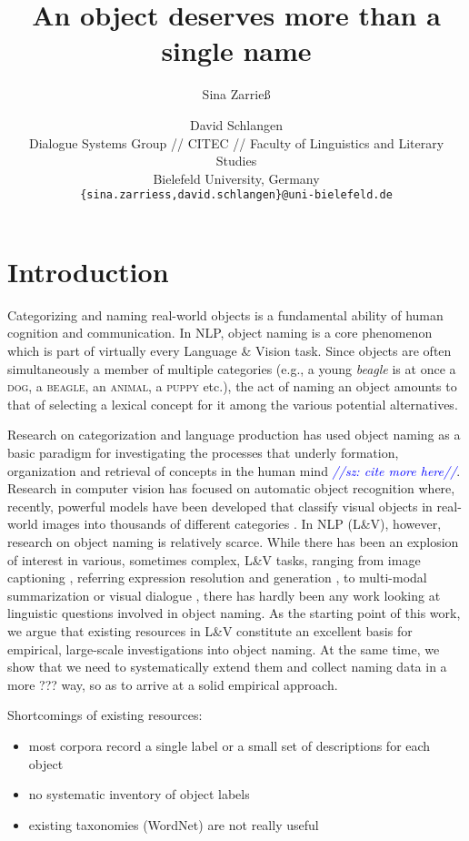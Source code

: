 \documentclass[11pt]{article}
\title{An object deserves more than a single name}
\author{Sina Zarrie{\ss}  \and David Schlangen\\
  Dialogue Systems Group // CITEC // Faculty of Linguistics and Literary Studies \\
 Bielefeld University, Germany \\
  {\tt \{sina.zarriess,david.schlangen\}@uni-bielefeld.de} \\}
\date{}
\newcommand{\sz}[1]{\textcolor{blue}{\emph{//sz: #1//}}}
\newcommand{\refexp}[1]{\textsl{#1}}
\newcommand{\cat}[1]{\textsc{#1}}
\begin{document}
\maketitle

\begin{abstract}
\end{abstract}


\section{Introduction}

Categorizing and naming real-world objects is a fundamental ability of human cognition and communication. In NLP, object naming is a core phenomenon which is part of virtually every Language \& Vision task.
Since objects are often simultaneously a member of multiple categories (e.g., a young \refexp{beagle} is at once a \cat{dog}, a \cat{beagle}, an \cat{animal}, a \cat{puppy} etc.), the act of naming an object amounts to that of selecting a lexical concept  for it among the various potential alternatives. 

Research on categorization and language production has used object naming as a basic paradigm for investigating the processes that underly formation, organization and retrieval of concepts in the human mind  \cite{rosch1976basic} \sz{cite more here}.
Research in computer vision has focused on automatic object recognition where, recently, powerful models have been developed that classify visual objects in real-world images into thousands of different categories .
In NLP (L\&V), however, research on object naming is relatively scarce.
While there has been an explosion of interest in various, sometimes complex, L\&V tasks, ranging from image captioning \cite{fangetal:2015,devlin:imcaqui,Bernardietal:automatic}, referring expression resolution and generation \cite{Kazemzadeh2014,mao15,Yu2016}, to multi-modal summarization or visual dialogue \cite{das2017visual,vries2017guesswhat}, there has hardly been any work looking at linguistic questions involved in object naming.
As the starting point of this work, we argue that existing resources in L\&V constitute an excellent basis for empirical, large-scale investigations into object naming.
At the same time, we show that we need to systematically extend them and collect naming data in a more ??? way, so as to arrive at a solid empirical approach.


Shortcomings of existing resources:

\begin{itemize}
\item most corpora record a single label or a small set of descriptions for each object
\item no systematic inventory of object labels
\item existing taxonomies (WordNet) are not really useful
\end{itemize}
\end{document}
